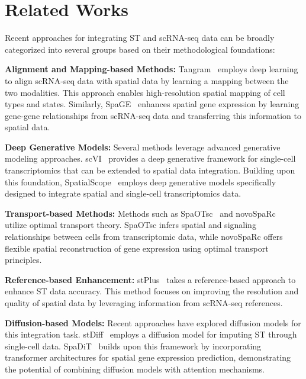 \section{Related Works}
Recent approaches for integrating ST and scRNA-seq data can be broadly categorized into several groups based on their methodological foundations:

\textbf{Alignment and Mapping-based Methods:} Tangram~\cite{Tangram} employs deep learning to align scRNA-seq data with spatial data by learning a mapping between the two modalities. This approach enables high-resolution spatial mapping of cell types and states. Similarly, SpaGE~\cite{SpaGE} enhances spatial gene expression by learning gene-gene relationships from scRNA-seq data and transferring this information to spatial data.

\textbf{Deep Generative Models:} Several methods leverage advanced generative modeling approaches. scVI~\cite{scVI} provides a deep generative framework for single-cell transcriptomics that can be extended to spatial data integration. Building upon this foundation, SpatialScope~\cite{SpatialScope} employs deep generative models specifically designed to integrate spatial and single-cell transcriptomics data.

\textbf{Transport-based Methods:} Methods such as SpaOTsc~\cite{SpaOTsc} and novoSpaRc~\cite{novoSpaRc} utilize optimal transport theory. SpaOTsc infers spatial and signaling relationships between cells from transcriptomic data, while novoSpaRc offers flexible spatial reconstruction of gene expression using optimal transport principles.

\textbf{Reference-based Enhancement:} stPlus~\cite{stPlus} takes a reference-based approach to enhance ST data accuracy. This method focuses on improving the resolution and quality of spatial data by leveraging information from scRNA-seq references.

\textbf{Diffusion-based Models:} Recent approaches have explored diffusion models for this integration task. stDiff~\cite{stDiff} employs a diffusion model for imputing ST through single-cell data. SpaDiT~\cite{li2024spadit} builds upon this framework by incorporating transformer architectures for spatial gene expression prediction, demonstrating the potential of combining diffusion models with attention mechanisms.

